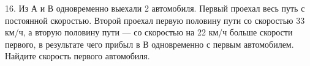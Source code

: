 16. Из А и В одновременно выехали 2 автомобиля. Первый проехал весь путь с постоянной скоростью. Второй проехал первую половину пути со скоростью 33 км/ч, а вторую половину пути --- со скоростью на 22 км/ч больше скорости первого, в результате чего прибыл в В одновременно с первым автомобилем. Найдите скорость первого автомобиля.\\

